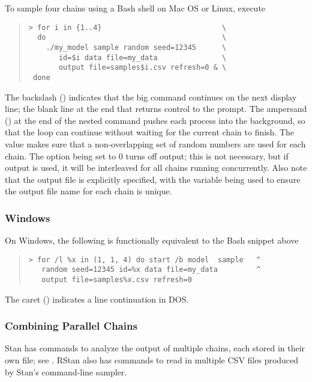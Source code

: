 To sample four chains using a Bash shell on Mac OS or Linux, execute
%
\begin{quote}
\begin{Verbatim}[fontshape=sl]
> for i in {1..4}                            \
  do                                         \
    ./my_model sample random seed=12345      \ 
       id=$i data file=my_data               \
       output file=samples$i.csv refresh=0 & \
 done
\end{Verbatim}
\end{quote}
%
The backslash (\code{\textbackslash}) indicates that the big command
continues on the next display line; the blank line at the end that
returns control to the prompt. The ampersand (\code{\&}) at the end of
the nested command pushes each process into the background, so that
the loop can continue without waiting for the current chain to finish.
The \code{id} value makes sure that a non-overlapping set of random
numbers are used for each chain.  The \code{refresh} option being set
to 0 turns off output; this is not necessary, but if output is used,
it will be interleaved for all chains running concurrently.  Also note
that the output file is explicitly specified, with the variable
\code{\$i} being used to ensure the output file name for each chain is
unique.

\subsubsection{Windows}

On Windows, the following is functionally equivalent to the Bash
snippet above
%
\begin{quote}
\begin{Verbatim}[fontshape=sl]
> for /l %x in (1, 1, 4) do start /b model  sample   ^
   random seed=12345 id=%x data file=my_data         ^
   output file=samples%x.csv refresh=0
\end{Verbatim}
\end{quote}
%
The caret (\code{\textasciicircum}) indicates a line continuation in
DOS.

\subsubsection{Combining Parallel Chains}

Stan has commands to analyze the output of multiple chains, each
stored in their own file;  see .  RStan also
has commands to read in multiple CSV files produced by Stan's
command-line sampler.  

